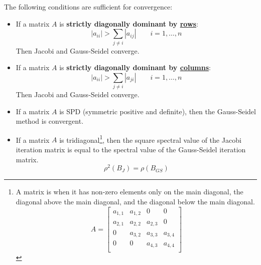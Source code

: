 \begin{theorem}
    The following conditions are sufficient for convergence:
    \begin{itemize}
        \item If a matrix $A$ is \textbf{strictly diagonally dominant by \underline{rows}}:
        \begin{equation*}
            \left|a_{ii}\right| > \displaystyle\sum_{j \ne i} \left|a_{ij}\right| \hspace{2em} i = 1, \dots, n
        \end{equation*}
        Then Jacobi and Gauss-Seidel converge.

        \item If a matrix $A$ is \textbf{strictly diagonally dominant by \underline{columns}}:
        \begin{equation*}
            \left|a_{ii}\right| > \displaystyle\sum_{j \ne i} \left|a_{ji}\right| \hspace{2em} i = 1, \dots, n
        \end{equation*}
        Then Jacobi and Gauss-Seidel converge.

        \item If a matrix $A$ is SPD (symmetric positive and definite), then the Gauss-Seidel method is convergent.
        
        \item If a matrix $A$ is tridiagonal\footnote{A matrix is  when it has non-zero elements only on the main diagonal, the diagonal above the main diagonal, and the diagonal below the main diagonal.
        \begin{equation*}
            A = \begin{bmatrix}
                a_{1,1} & a_{1,2} & 0       & 0  \\
                a_{2,1} & a_{2,2} & a_{2,3} & 0  \\
                0 & a_{3,2} & a_{3,3} & a_{3,4} \\
                0 & 0 & a_{4,3} & a_{4,4} \\
            \end{bmatrix}
        \end{equation*}
        }, then the square spectral value of the Jacobi iteration matrix is equal to the spectral value of the Gauss-Seidel iteration matrix.
        \begin{equation*}
            \rho^{2}\left(B_{J}\right) = \rho\left(B_{GS}\right)
        \end{equation*}
    \end{itemize}
\end{theorem}
